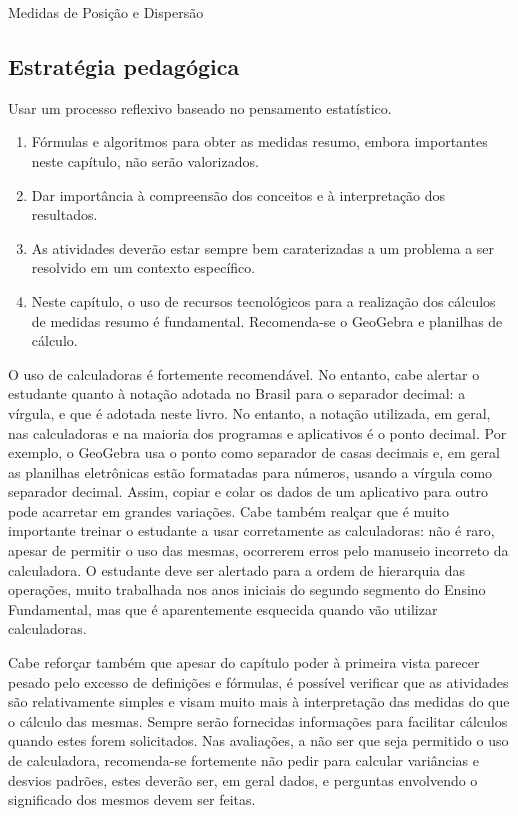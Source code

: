 \begin{apresentacao}{Medidas de Posição e Dispersão}
\subsection{Estratégia pedagógica}

Usar um processo reflexivo baseado no pensamento estatístico.

\begin{enumerate}
\item Fórmulas e algoritmos para obter as medidas resumo, embora importantes neste capítulo, não serão valorizados.
\item Dar importância à compreensão dos conceitos e à interpretação dos resultados.
\item As atividades deverão estar sempre bem caraterizadas a um problema a ser resolvido em um contexto específico.
\item Neste capítulo, o uso de recursos tecnológicos para a realização dos cálculos de medidas resumo é fundamental. Recomenda-se o GeoGebra e planilhas de cálculo.
\end{enumerate}

O uso de calculadoras é fortemente recomendável. No entanto, cabe alertar o estudante quanto à notação adotada no Brasil para o separador decimal: a vírgula, e que é adotada neste livro. No entanto, a notação utilizada, em geral, nas calculadoras e na maioria dos programas e aplicativos é o ponto decimal. Por exemplo, o GeoGebra usa o ponto como separador de casas decimais e, em geral as planilhas eletrônicas estão formatadas para números, usando a vírgula como separador decimal. Assim, copiar e colar os dados de um aplicativo para outro pode acarretar em grandes variações. Cabe também realçar que é muito importante treinar o estudante a usar corretamente as calculadoras: não é raro, apesar de permitir o uso das mesmas, ocorrerem erros pelo manuseio incorreto da calculadora. O estudante deve ser alertado para a ordem de hierarquia das operações, muito trabalhada nos anos iniciais do segundo segmento do Ensino Fundamental, mas que é aparentemente esquecida quando vão utilizar calculadoras.

Cabe reforçar também que apesar do capítulo poder à primeira vista parecer pesado pelo excesso de definições e fórmulas, é possível verificar que as atividades são relativamente simples e visam muito mais à interpretação das medidas do que o cálculo das mesmas. Sempre serão fornecidas informações para facilitar cálculos quando estes forem solicitados. Nas avaliações, a não ser que seja permitido o uso de calculadora, recomenda-se fortemente não pedir para calcular variâncias e desvios padrões, estes deverão ser, em geral dados, e perguntas envolvendo o significado dos mesmos devem ser feitas.


\end{apresentacao}
